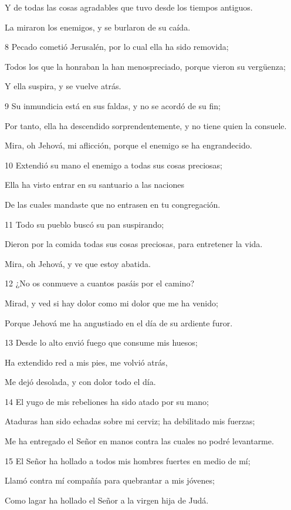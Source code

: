 \par Y de todas las cosas agradables que tuvo desde los tiempos antiguos.
\par La miraron los enemigos, y se burlaron de su caída.
\par 8 Pecado cometió Jerusalén, por lo cual ella ha sido removida;
\par Todos los que la honraban la han menospreciado, porque vieron su vergüenza;
\par Y ella suspira, y se vuelve atrás.
\par 9 Su inmundicia está en sus faldas, y no se acordó de su fin;
\par Por tanto, ella ha descendido sorprendentemente, y no tiene quien la consuele.
\par Mira, oh Jehová, mi aflicción, porque el enemigo se ha engrandecido.
\par 10 Extendió su mano el enemigo a todas sus cosas preciosas;
\par Ella ha visto entrar en su santuario a las naciones
\par De las cuales mandaste que no entrasen en tu congregación.
\par 11 Todo su pueblo buscó su pan suspirando;
\par Dieron por la comida todas sus cosas preciosas, para entretener la vida.
\par Mira, oh Jehová, y ve que estoy abatida.
\par 12 ¿No os conmueve a cuantos pasáis por el camino?
\par Mirad, y ved si hay dolor como mi dolor que me ha venido;
\par Porque Jehová me ha angustiado en el día de su ardiente furor.
\par 13 Desde lo alto envió fuego que consume mis huesos;
\par Ha extendido red a mis pies, me volvió atrás,
\par Me dejó desolada, y con dolor todo el día.
\par 14 El yugo de mis rebeliones ha sido atado por su mano;
\par Ataduras han sido echadas sobre mi cerviz; ha debilitado mis fuerzas;
\par Me ha entregado el Señor en manos contra las cuales no podré levantarme.
\par 15 El Señor ha hollado a todos mis hombres fuertes en medio de mí;
\par Llamó contra mí compañía para quebrantar a mis jóvenes;
\par Como lagar ha hollado el Señor a la virgen hija de Judá.
